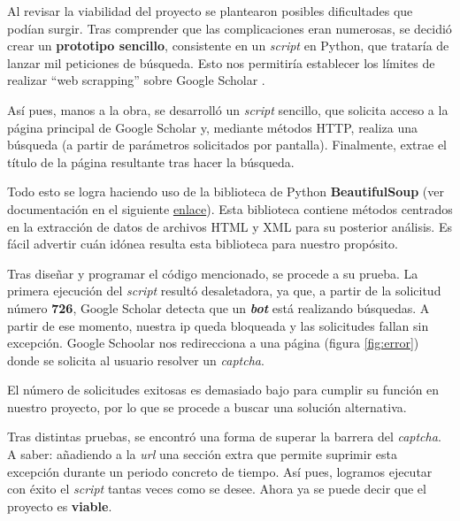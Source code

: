 
Al revisar la viabilidad del proyecto se plantearon posibles dificultades que podían surgir. Tras comprender que las complicaciones eran numerosas, se decidió crear un \textbf{prototipo sencillo}, consistente en un \textit{script} en Python, que trataría de lanzar  mil peticiones de búsqueda. Esto nos permitiría establecer los límites de realizar ``web scrapping'' sobre Google Scholar .

Así pues, manos a la obra, se desarrolló un \textit{script} sencillo, que solicita acceso a la página principal de Google Scholar y, mediante métodos HTTP, realiza una búsqueda (a partir de parámetros solicitados por pantalla). Finalmente, extrae el título de la página resultante tras hacer la búsqueda. 

Todo esto se logra haciendo uso de la biblioteca de Python \textbf{BeautifulSoup} (ver documentación en el siguiente \href{https://beautiful-soup-4.readthedocs.io/en/latest/}{enlace}). Esta biblioteca contiene métodos centrados en la extracción de datos de archivos HTML y XML para su posterior análisis. Es fácil advertir cuán idónea resulta esta biblioteca para nuestro propósito.

Tras diseñar y programar el código mencionado, se procede a su prueba. La primera ejecución del \textit{script} resultó desaletadora, ya que, a partir de la solicitud número \textbf{726}, Google Scholar detecta que un \textbf{\textit{bot}} está realizando búsquedas. A partir de ese momento, nuestra ip queda bloqueada y las solicitudes fallan sin excepción. Google Schoolar nos redirecciona a una página (figura \ref{fig:error}) donde se solicita al usuario resolver un \textit{captcha}. 


El número de solicitudes exitosas es demasiado bajo para cumplir su función en nuestro proyecto, por lo que se procede a buscar una solución alternativa. 

Tras distintas pruebas, se encontró una forma de superar la barrera del \textit{captcha}. A saber: añadiendo a la \textit{url} una sección extra que permite suprimir esta excepción durante un periodo concreto de tiempo. Así pues, logramos ejecutar con éxito el \textit{script} tantas veces como se desee. Ahora ya se puede decir que el proyecto es \textbf{viable}.

